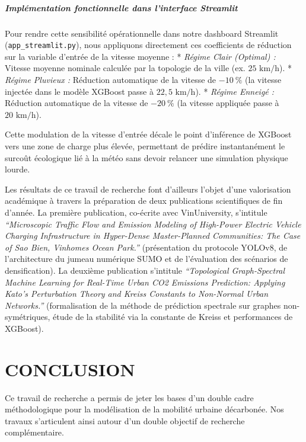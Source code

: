 \documentclass[10pt, a4paper]{article}
\begin{document}
\subparagraph{Implémentation fonctionnelle dans l'interface
Streamlit}\label{impluxe9mentation-fonctionnelle-dans-linterface-streamlit}

Pour rendre cette sensibilité opérationnelle dans notre dashboard
Streamlit (\texttt{app\_streamlit.py}), nous appliquons directement ces
coefficients de réduction sur la variable d'entrée de la vitesse moyenne
: * \emph{Régime Clair (Optimal) :} Vitesse moyenne nominale calculée
par la topologie de la ville (ex. \(25\text{ km/h}\)). * \emph{Régime
Pluvieux :} Réduction automatique de la vitesse de \(-10\ \%\) (la
vitesse injectée dans le modèle XGBoost passe à \(22,5\text{ km/h}\)). *
\emph{Régime Enneigé :} Réduction automatique de la vitesse de
\(-20\ \%\) (la vitesse appliquée passe à \(20\text{ km/h}\)).

Cette modulation de la vitesse d'entrée décale le point d'inférence de
XGBoost vers une zone de charge plus élevée, permettant de prédire
instantanément le surcoût écologique lié à la météo sans devoir relancer
une simulation physique lourde.

Les résultats de ce travail de recherche font d'ailleurs l'objet d'une
valorisation académique à travers la préparation de deux publications
scientifiques de fin d'année. La première publication, co-écrite avec
VinUniversity, s'intitule \emph{``Microscopic Traffic Flow and Emission
Modeling of High-Power Electric Vehicle Charging Infrastructure in
Hyper-Dense Master-Planned Communities: The Case of Sao Bien, Vinhomes
Ocean Park.''} (présentation du protocole YOLOv8, de l'architecture du
jumeau numérique SUMO et de l'évaluation des scénarios de
densification). La deuxième publication s'intitule \emph{``Topological
Graph-Spectral Machine Learning for Real-Time Urban CO2 Emissions
Prediction: Applying Kato's Perturbation Theory and Kreiss Constants to
Non-Normal Urban Networks.''} (formalisation de la méthode de prédiction
spectrale sur graphes non-symétriques, étude de la stabilité via la
constante de Kreiss et performances de XGBoost).

\newpage

\section{CONCLUSION}\label{conclusion}

Ce travail de recherche a permis de jeter les bases d'un double cadre
méthodologique pour la modélisation de la mobilité urbaine décarbonée.
Nos travaux s'articulent ainsi autour d'un double objectif de recherche
complémentaire.
\end{document}
